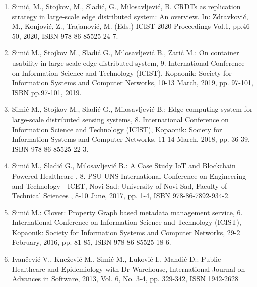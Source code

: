 \begin{itemize}
	\begin{enumerate}[start=1,label={(\bfseries \arabic*)}]
		\item Simić, M., Stojkov, M., Sladić, G., Milosavljević, B.  CRDTs as replication strategy in large-scale edge distributed system: An overview. In: Zdravković, M., Konjović, Z., Trajanović, M. (Eds.) ICIST 2020 Proceedings Vol.1, pp.46-50, 2020, ISBN 978-86-85525-24-7.
		\item Simić M., Stojkov M., Sladić G., Milosavljević B., Zarić M.:   On container usability in large-scale edge distributed system, 9. International Conference on Information Science and Technology (ICIST), Kopaonik: Society for Information Systems and Computer Networks, 10-13 March, 2019, pp. 97-101, ISBN pp.97-101, 2019.
		\item Simić M., Stojkov M., Sladić G., Milosavljević B.:  Edge computing system for large-scale distributed sensing systems, 8. International Conference on Information Science and Technology (ICIST), Kopaonik: Society for Information Systems and Computer Networks, 11-14 March, 2018, pp. 36-39, ISBN 978-86-85525-22-3.
		\item Simić M., Sladić G., Milosavljević B.:  A Case Study IoT and Blockchain Powered Healthcare , 8. PSU-UNS International Conference on Engineering and Technology - ICET, Novi Sad: University of Novi Sad, Faculty of Technical Sciences , 8-10 June, 2017, pp. 1-4, ISBN 978-86-7892-934-2.
		\item Simić M.:  Clover: Property Graph based metadata management service, 6. International Conference on Information Science and Technology (ICIST), Kopaonik: Society for Information Systems and Computer Networks, 29-2 February, 2016, pp. 81-85, ISBN 978-86-85525-18-6.
		\item Ivančević V., Knežević M., Simić M., Luković I., Mandić D.:  Public Healthcare and Epidemiology with Dr Warehouse, International Journal on Advances in Software, 2013, Vol. 6, No. 3-4, pp. 329-342, ISSN 1942-2628
	\end{enumerate}
	
\end{itemize}
%
%